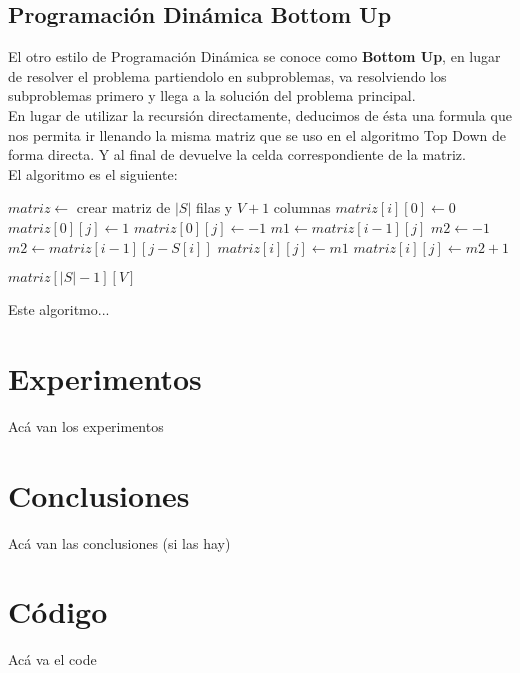 \documentclass[a4paper]{article}
\begin{document}
\subsection{Programaci\'on Din\'amica Bottom Up}

El otro estilo de Programación Dinámica se conoce como \textbf{Bottom Up}, en lugar de resolver el problema partiendolo en subproblemas, va resolviendo los subproblemas primero y llega a la solución del problema principal.
\\
En lugar de utilizar la recursión directamente, deducimos de ésta una formula que nos permita ir llenando la misma matriz que se uso en el algoritmo Top Down de forma directa. Y al final de devuelve la celda correspondiente de la matriz.
\\
El algoritmo es el siguiente:

\begin{algorithm}
\begin{algorithmic}
		\State $matriz \gets$ crear matriz de $|S|$ filas y $V+1$ columnas
			\State $matriz[i][0] \gets 0$
		\EndFor
				\State $matriz[0][j] \gets 1$
			\Else
				\State $matriz[0][j] \gets -1$
			\EndIf
		\EndFor
			\State $m1 \gets matriz[i-1][j]$			
				\State $m2 \gets -1$
			\Else
				\State $m2 \gets matriz[i-1][j - S[i]]$
			\EndIf
				\State $matriz[i][j] \gets m1$
			\Else
				\State $matriz[i][j] \gets m2 + 1$
			\EndIf
			\EndFor
		\EndFor
		
		\State \Return $matriz[|S|-1][V]$
	\EndProcedure
\end{algorithmic}
\end{algorithm}

Este algoritmo...

\section{Experimentos}
Acá van los experimentos
\section{Conclusiones}
Acá van las conclusiones (si las hay)
\section{Código}
Acá va el code
\end{document}
